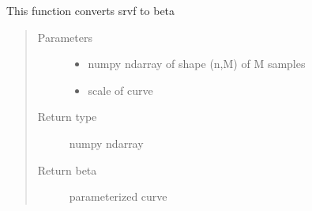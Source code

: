 \documentclass[letterpaper,10pt,english]{sphinxmanual}
\begin{document}
\begin{fulllineitems}
\label{\detokenize{curve_functions:curve_functions.q_to_curve}}
This function converts srvf to beta
\begin{quote}\begin{description}
\item[{Parameters}] \leavevmode\begin{itemize}
\item {} 
 \textendash{} numpy ndarray of shape (n,M) of M samples

\item {} 
 \textendash{} scale of curve

\end{itemize}

\item[{Return type}] \leavevmode
numpy ndarray

\item[{Return beta}] \leavevmode
parameterized curve

\end{description}\end{quote}

\end{fulllineitems}

\end{document}
